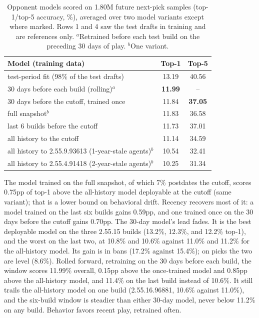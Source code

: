 \documentclass[journal]{IEEEtran}
\begin{document}
\begin{table}[t]
\caption{Opponent models scored on 1.80M future next-pick samples
(top-1/top-5 accuracy, \%), averaged over two model variants except where
marked. Rows 1 and 4 saw the test drafts in training and are references
only. $^{a}$Retrained before each test build on the preceding 30 days of
play. $^{b}$One variant.}
\label{tab:gdpools}
\centering
\small
\setlength{\tabcolsep}{4pt}
\begin{tabular}{lcc}
\toprule
Model (training data) & Top-1 & Top-5 \\
\midrule
test-period fit (98\% of the test drafts) & 13.19 & 40.56 \\
30 days before each build (rolling)$^{a}$ & \textbf{11.99} & -- \\
30 days before the cutoff, trained once & 11.84 & \textbf{37.05} \\
full snapshot$^{b}$ & 11.83 & 36.58 \\
last 6 builds before the cutoff & 11.73 & 37.01 \\
all history to the cutoff & 11.14 & 34.59 \\
\midrule
all history to 2.55.9.93613 (1-year-stale agents)$^{b}$ & 10.54 & 32.41 \\
all history to 2.55.4.91418 (2-year-stale agents)$^{b}$ & 10.25 & 31.34 \\
\bottomrule
\end{tabular}
\end{table}

The model trained on the full snapshot, of which 7\% postdates the
cutoff, scores 0.75pp of top-1 above the all-history model deployable at
the cutoff (same variant); that is a lower bound on behavioral drift.
Recency recovers most of it: a model trained on the last six builds
gains 0.59pp, and one trained once on the 30 days before the cutoff
gains 0.70pp. The 30-day model's lead fades. It is the best deployable
model on the three 2.55.15 builds (13.2\%, 12.3\%, and 12.2\% top-1),
and the worst on the last two, at 10.8\% and 10.6\% against 11.0\% and
11.2\% for the all-history model. Its gain is in bans (17.2\% against
15.4\%); on picks the two are level (8.6\%). Rolled forward, retraining
on the 30 days before each build, the window scores 11.99\% overall,
0.15pp above the once-trained model and 0.85pp above the all-history
model, and 11.4\% on the last build instead of 10.6\%. It still trails
the all-history model on one build (2.55.16.96881, 10.6\% against
11.0\%), and the six-build window is steadier than either 30-day model,
never below 11.2\% on any build. Behavior favors recent play, retrained
often.
\end{document}
